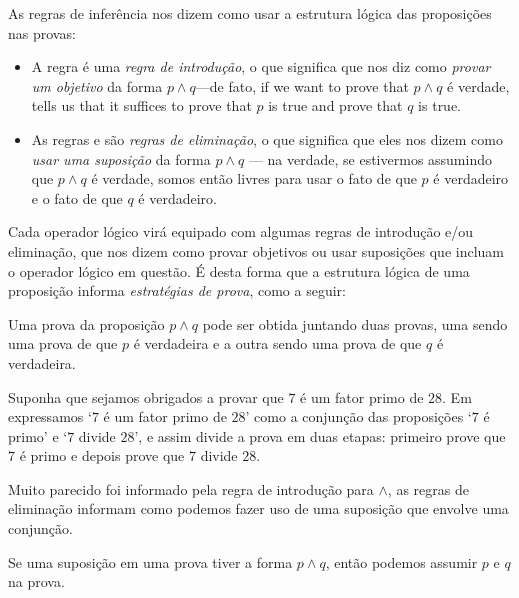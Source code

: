 As regras de inferência nos dizem como usar a estrutura lógica das proposições nas provas:

\begin{itemize}
\item A regra \introrule{\wedge} é uma \textit{regra de introdução}, o que significa que nos diz como \textit{provar um objetivo} da forma $p \wedge q$---de fato, if we want to prove that $p \wedge q$ é verdade, \introrule{\wedge} tells us that it suffices to prove that $p$ is true and prove that $q$ is true.

\item As regras  e  são \textit{regras de eliminação}, o que significa que eles nos dizem como \textit{usar uma suposição} da forma $p \wedge q$ --- na verdade, se estivermos assumindo que $p \wedge q$ é verdade, somos então livres para usar o fato de que $p$ é verdadeiro e o fato de que $q$ é verdadeiro.
\end{itemize}

Cada operador lógico virá equipado com algumas regras de introdução e/ou eliminação, que nos dizem como provar objetivos ou usar suposições que incluam o operador lógico em questão. É desta forma que a estrutura lógica de uma proposição informa \textit{estratégias de prova}, como a seguir:

\begin{strategy}
\label{strProvingConjunctionsDirect}
Uma prova da proposição $p \wedge q$ pode ser obtida juntando duas provas, uma sendo uma prova de que $p$ é verdadeira e a outra sendo uma prova de que $q$ é verdadeira.
\end{strategy}

\begin{example}
\label{exSevenDividesTwentyEightConjunctionProof}
Suponha que sejamos obrigados a provar que $7$ é um fator primo de $28$. Em  expressamos `$7$ é um fator primo de $28$' como a conjunção das proposições `$7$ é primo' e `$7$ divide $28$', e assim  divide a prova em duas etapas: primeiro prove que $7$ é primo e depois prove que $7$ divide $28$.
\end{example}

Muito parecido  foi informado pela regra de introdução para $\wedge$, as regras de eliminação informam como podemos fazer uso de uma suposição que envolve uma conjunção.
\begin{strategy}
\label{strAssumingConjunctionsDirect}
Se uma suposição em uma prova tiver a forma $p \wedge q$, então podemos assumir $p$ e $q$ na prova.
\end{strategy}

